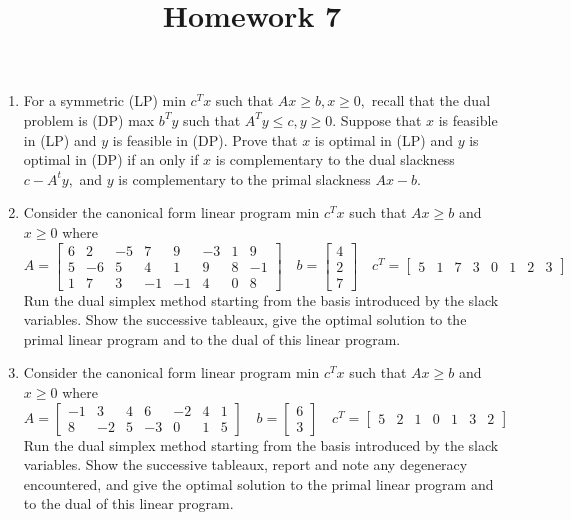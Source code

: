\documentclass{article}
\begin{document}
\title{Homework 7}
\maketitle
\thispagestyle{fancy}

\begin{enumerate}
	\item For a symmetric (LP) min $c^T x$ such that $Ax\ge b, x\ge 0,$ recall that the dual problem is (DP) max $b^T y$ such that $A^T y\le c, y\ge 0.$ Suppose that $x$ is feasible in (LP) and $y$ is feasible in (DP). Prove that $x$ is optimal in (LP) and $y$ is optimal in (DP) if an only if $x$ is complementary to the dual slackness $c-A^t y,$ and $y$ is complementary to the primal slackness $Ax-b.$

	\item Consider the canonical form linear program min $c^T x$ such that $Ax\ge b$ and $x\ge 0$ where \[A=\begin{bmatrix}
				6 & 2 & -5 & 7 & 9 & -3 & 1 & 9 \\
				5 & -6 & 5 & 4 & 1 & 9 & 8 & -1 \\
				1 & 7 & 3 & -1 & -1 & 4 & 0 & 8
			\end{bmatrix} \quad b=\begin{bmatrix}
				4 \\ 2 \\ 7
			\end{bmatrix}\quad c^T = \begin{bmatrix}
				5 & 1 & 7 & 3 & 0 & 1 & 2 & 3
		\end{bmatrix}\] Run the dual simplex method starting from the basis introduced by the slack variables. Show the successive tableaux, give the optimal solution to the primal linear program and to the dual of this linear program. 

	\item Consider the canonical form linear program min $c^T x$ such that $Ax\ge b$ and $x\ge 0$ where \[A=\begin{bmatrix}
				-1 & 3 & 4 & 6 & -2 & 4 & 1 \\
				8 & -2 & 5 & -3 & 0 & 1 & 5
			\end{bmatrix} \quad b=\begin{bmatrix}
				6 \\ 3
			\end{bmatrix} \quad c^T = \begin{bmatrix}
				5 & 2 & 1 & 0 & 1 & 3 & 2
		\end{bmatrix}\] Run the dual simplex method starting from the basis introduced by the slack variables. Show the successive tableaux, report and note any degeneracy encountered, and give the optimal solution to the primal linear program and to the dual of this linear program.


\end{enumerate}
\end{document}
